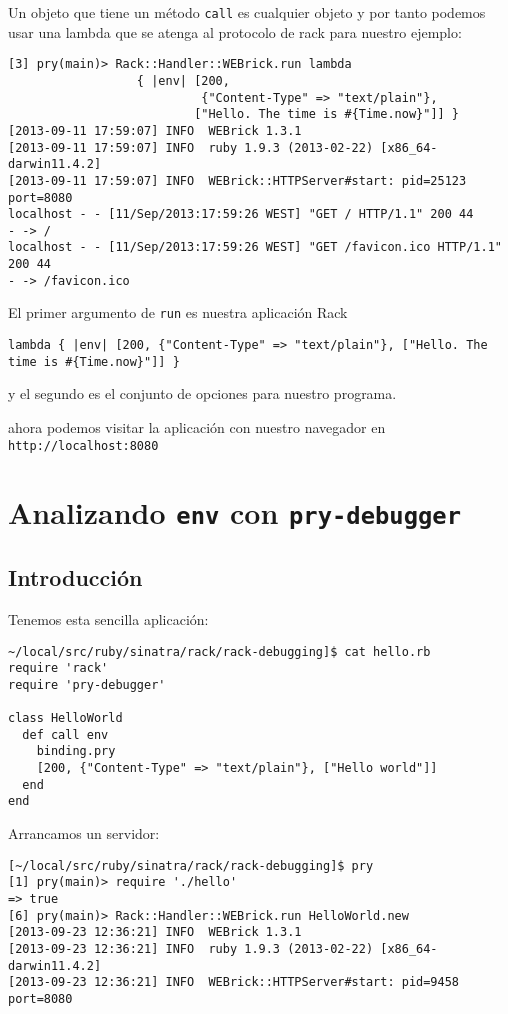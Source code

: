 Un objeto que tiene un método \verb|call| es cualquier objeto \Proc{} y por 
tanto podemos usar una lambda que se atenga al protocolo de rack para nuestro ejemplo:
\begin{verbatim}
[3] pry(main)> Rack::Handler::WEBrick.run lambda 
                  { |env| [200, 
                           {"Content-Type" => "text/plain"}, 
                          ["Hello. The time is #{Time.now}"]] }
[2013-09-11 17:59:07] INFO  WEBrick 1.3.1
[2013-09-11 17:59:07] INFO  ruby 1.9.3 (2013-02-22) [x86_64-darwin11.4.2]
[2013-09-11 17:59:07] INFO  WEBrick::HTTPServer#start: pid=25123 port=8080
localhost - - [11/Sep/2013:17:59:26 WEST] "GET / HTTP/1.1" 200 44
- -> /
localhost - - [11/Sep/2013:17:59:26 WEST] "GET /favicon.ico HTTP/1.1" 200 44
- -> /favicon.ico
\end{verbatim}
El primer argumento de \verb|run| es nuestra aplicación Rack 
\begin{verbatim}
lambda { |env| [200, {"Content-Type" => "text/plain"}, ["Hello. The time is #{Time.now}"]] }
\end{verbatim}
y el segundo es el conjunto de opciones para nuestro programa.

ahora podemos visitar la aplicación con nuestro navegador
en \verb|http://localhost:8080|

\section{Analizando {\tt env} con {\tt pry-debugger}}

\subsection{Introducción}

Tenemos esta sencilla aplicación:

\begin{verbatim}
~/local/src/ruby/sinatra/rack/rack-debugging]$ cat hello.rb 
require 'rack'
require 'pry-debugger'

class HelloWorld
  def call env
    binding.pry
    [200, {"Content-Type" => "text/plain"}, ["Hello world"]]
  end
end

\end{verbatim}

Arrancamos un servidor:
\begin{verbatim}
[~/local/src/ruby/sinatra/rack/rack-debugging]$ pry
[1] pry(main)> require './hello'
=> true
[6] pry(main)> Rack::Handler::WEBrick.run HelloWorld.new
[2013-09-23 12:36:21] INFO  WEBrick 1.3.1
[2013-09-23 12:36:21] INFO  ruby 1.9.3 (2013-02-22) [x86_64-darwin11.4.2]
[2013-09-23 12:36:21] INFO  WEBrick::HTTPServer#start: pid=9458 port=8080
\end{verbatim}

